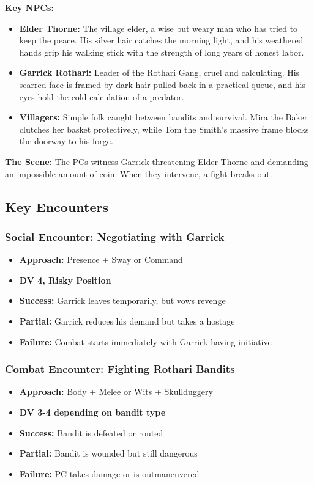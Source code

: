 \documentclass[11pt]{article}
\newenvironment{encounterbox}[1]{%
  \begin{mdframed}[backgroundcolor=encountercolor!30, linewidth=1pt, linecolor=accentcolor]%
  \subsubsection*{#1}%
}{%
  \end{mdframed}%
}
\begin{document}
\textbf{Key NPCs:}
\begin{itemize}
\item \textbf{Elder Thorne:} The village elder, a wise but weary man who has tried to keep the peace. His silver hair catches the morning light, and his weathered hands grip his walking stick with the strength of long years of honest labor.
\item \textbf{Garrick Rothari:} Leader of the Rothari Gang, cruel and calculating. His scarred face is framed by dark hair pulled back in a practical queue, and his eyes hold the cold calculation of a predator.
\item \textbf{Villagers:} Simple folk caught between bandits and survival. Mira the Baker clutches her basket protectively, while Tom the Smith's massive frame blocks the doorway to his forge.
\end{itemize}

\textbf{The Scene:} The PCs witness Garrick threatening Elder Thorne and demanding an impossible amount of coin. When they intervene, a fight breaks out.

\subsection{Key Encounters}

\begin{encounterbox}{Social Encounter: Negotiating with Garrick}
\begin{itemize}
\item \textbf{Approach:} Presence + Sway or Command
\item \textbf{DV 4, Risky Position}
\item \textbf{Success:} Garrick leaves temporarily, but vows revenge
\item \textbf{Partial:} Garrick reduces his demand but takes a hostage
\item \textbf{Failure:} Combat starts immediately with Garrick having initiative
\end{itemize}
\end{encounterbox}

\begin{encounterbox}{Combat Encounter: Fighting Rothari Bandits}
\begin{itemize}
\item \textbf{Approach:} Body + Melee or Wits + Skullduggery
\item \textbf{DV 3-4 depending on bandit type}
\item \textbf{Success:} Bandit is defeated or routed
\item \textbf{Partial:} Bandit is wounded but still dangerous
\item \textbf{Failure:} PC takes damage or is outmaneuvered
\end{itemize}
\end{encounterbox}
\end{document}
